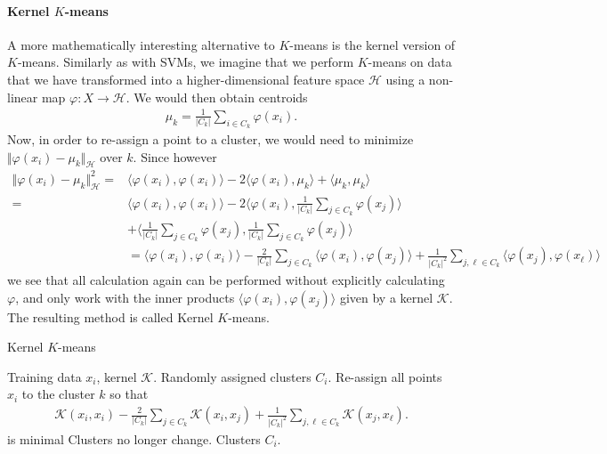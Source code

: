 \documentclass{article}
\newcommand{\calH}{\mathcal{H}}
\newcommand{\sprod}[1]{\langle #1 \rangle}
\newcommand{\abs}[1]{\vert #1 \vert}
\newcommand{\norm}[1]{\Vert #1 \Vert}
\begin{document}
\paragraph{Kernel $K$-means} A more mathematically interesting alternative to $K$-means is the kernel version of $K$-means. Similarly as with SVMs, we imagine that we perform $K$-means on data that we have transformed into a higher-dimensional feature space $\calH$ using a non-linear map $\varphi:X \to \calH$. We would then obtain centroids
\begin{align*}
    \mu_k = \frac{1}{\abs{C_k}}\sum_{i \in C_k} \varphi(x_i).
\end{align*}
Now, in order to re-assign a point to a cluster, we would need to minimize $\norm{\varphi(x_i)-\mu_k}_\calH$ over $k$. Since however
\begin{align*}
    \norm{\varphi(x_i)-\mu_k}_\calH^2 =& \sprod{\varphi(x_i),\varphi(x_i)} - 2 \sprod{\varphi(x_i), \mu_k} + \sprod{\mu_k,\mu_k} \\
     =&  \sprod{\varphi(x_i),\varphi(x_i)} - 2 \sprod{ \varphi(x_i), \frac{1}{\abs{C_k}}\sum_{j \in C_k} \varphi(x_j)} \\
    &+ \sprod{\frac{1}{\abs{C_k}}\sum_{j \in C_k} \varphi(x_j),\frac{1}{\abs{C_k}}\sum_{j \in C_k} \varphi(x_j)} \\
    &= \sprod{\varphi(x_i),\varphi(x_i)} - \frac{2}{\abs{C_k}}\sum_{j \in C_k} \sprod{\varphi(x_i),\varphi(x_j)} + \frac{1}{\abs{C_k}^2} \sum_{j,\ell\in C_k} \sprod{\varphi(x_j),\varphi(x_\ell)}
\end{align*}
we see that all calculation again can be performed without explicitly calculating $\varphi$, and only work with the inner products $\sprod{\varphi(x_i),\varphi(x_j)}$ given by a kernel $\mathcal{K}$. The resulting method is called Kernel $K$-means.

    \begin{algorithm}[tb]      
	\caption{Kernel $K$-means} 
	\label{alg:kernelkmeans}
	\begin{algorithmic} [1]
 		\REQUIRE Training data $x_i$, kernel $\mathcal{K}$.
 		\STATE Randomly assigned clusters $C_i$.
 		\REPEAT
 			\STATE  Re-assign all points $x_i$ to the cluster $k$ so that 
    \begin{align*}
        \mathcal{K}(x_i,x_i)  - \frac{2}{\abs{C_k}}\sum_{j \in C_k} \mathcal{K}(x_i,x_j) + \frac{1}{\abs{C_k}^2} \sum_{j,\ell\in C_k} \mathcal{K}(x_j,x_\ell).
    \end{align*}
    is minimal
 		\UNTIL Clusters no longer change.
 		\RETURN Clusters $C_i$.
	\end{algorithmic}
\end{algorithm}
\end{document}
